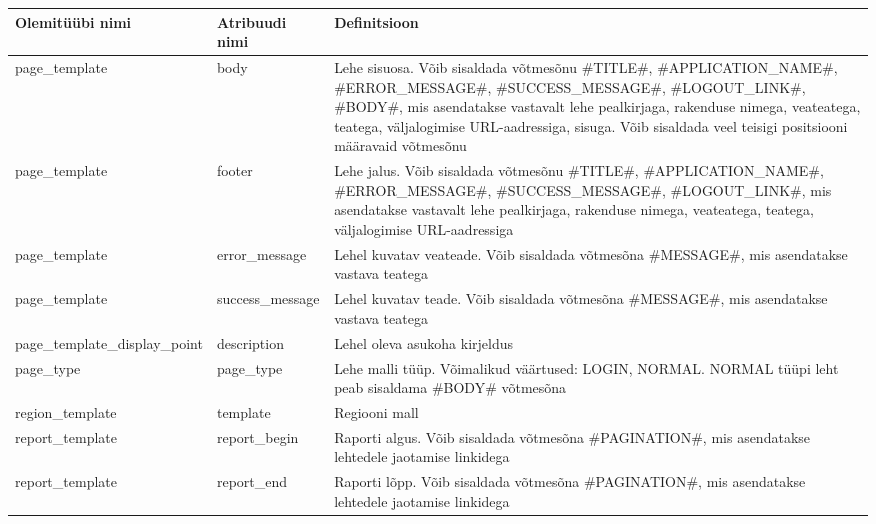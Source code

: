 \documentclass[a4paper,12pt]{article} %
\begin{document}
\begin{table}[H]
\centering
\begin{tabular}{|p{5cm}|p{5cm}|p{5cm}|}
\hline
\rowcolor{rowgray}
Olemitüübi nimi & Atribuudi nimi & Definitsioon \\ \hline
page\_template & body & Lehe sisuosa. Võib sisaldada võtmesõnu \#TITLE\#, \#APPLICATION\_NAME\#, \#ERROR\_MESSAGE\#, \#SUCCESS\_MESSAGE\#, \#LOGOUT\_LINK\#,  \#BODY\#, mis asendatakse vastavalt lehe pealkirjaga, rakenduse nimega, veateatega, teatega, väljalogimise URL-aadressiga, sisuga. Võib sisaldada veel teisigi positsiooni määravaid võtmesõnu \\ \hline
page\_template & footer & Lehe jalus. Võib sisaldada võtmesõnu \#TITLE\#, \#APPLICATION\_NAME\#, \#ERROR\_MESSAGE\#, \#SUCCESS\_MESSAGE\#, \#LOGOUT\_LINK\#, mis asendatakse vastavalt lehe pealkirjaga, rakenduse nimega, veateatega, teatega, väljalogimise URL-aadressiga \\ \hline
page\_template & error\_message & Lehel kuvatav veateade. Võib sisaldada võtmesõna \#MESSAGE\#, mis asendatakse vastava teatega \\ \hline
page\_template & success\_message & Lehel kuvatav teade. Võib sisaldada võtmesõna \#MESSAGE\#, mis asendatakse vastava teatega \\ \hline
page\_template\_display\_point & description & Lehel oleva asukoha kirjeldus \\ \hline
page\_type & page\_type & Lehe malli tüüp. Võimalikud väärtused: LOGIN, NORMAL. NORMAL tüüpi leht peab sisaldama \#BODY\# võtmesõna \\ \hline
region\_template & template & Regiooni mall \\ \hline
report\_template & report\_begin & Raporti algus. Võib sisaldada võtmesõna \#PAGINATION\#, mis asendatakse lehtedele jaotamise linkidega \\ \hline
report\_template & report\_end & Raporti lõpp. Võib sisaldada võtmesõna \#PAGINATION\#, mis asendatakse lehtedele jaotamise linkidega \\ \hline
\end{tabular}
\end{table}
\end{document}
